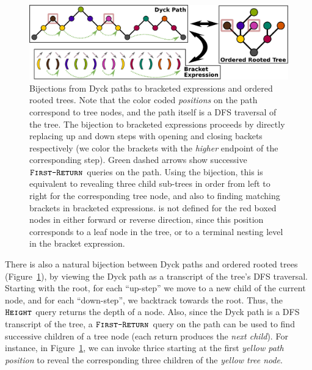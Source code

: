 \label{sec:bijections_to_other_catalan_objects}
\begin{figure}[htbp]
    \centering
    \includegraphics[width=\textwidth]{images/dyck_tree_bijection.pdf}
    \caption{Bijections from Dyck paths to bracketed expressions and ordered rooted trees.
    Note that the color coded \emph{positions} on the path correspond to tree nodes, and the path itself is a DFS traversal of the tree.
    The bijection to bracketed expressions proceeds by directly replacing up and down steps with opening and closing backets respectively
    (we color the brackets with the \emph{higher} endpoint of the corresponding step).
    Green dashed arrows show successive $\texttt{\textsc{First-Return}}$ queries on the path.
    Using the bijection, this is equivalent to revealing three child sub-trees in order from left to right for the corresponding tree node,
    and also to finding matching brackets in bracketed expressions.
     is not defined for the red boxed nodes in either forward or reverse direction,
    since this position corresponds to a leaf node in the tree, or to a terminal nesting level in the bracket expression.}
    \label{fig:dyck_bijection}
\end{figure}
There is also a natural bijection between Dyck paths and ordered rooted trees (Figure~\ref{fig:dyck_bijection}),
by viewing the Dyck path as a transcript of the tree's DFS traversal.
Starting with the root, for each ``up-step'' we move to a new child of the current node, and for each ``down-step'', we backtrack towards the root.
Thus, the $\texttt{\textsc{Height}}$ query returns the depth of a node.
Also, since the Dyck path is a DFS transcript of the tree, a $\texttt{\textsc{First-Return}}$ query on the path
can be used to find successive children of a tree node (each return produces the \emph{next child}).
For instance, in Figure~\ref{fig:dyck_bijection}, we can invoke  thrice
starting at the first \emph{yellow path position} to reveal the corresponding three children of the \emph{yellow tree node}.

